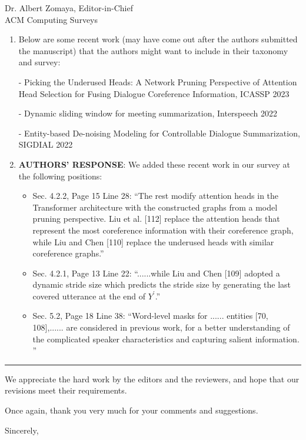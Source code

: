 \documentclass[11pt]{letter} %
\begin{document}
\begin{letter}{
Dr. Albert Zomaya, Editor-in-Chief  \\
ACM Computing Surveys}
\begin{enumerate}
\begin{itemize}
		\end{itemize}
	
	\item Below are some recent work (may have come out after the authors submitted the manuscript) that the authors might want to include in their taxonomy and survey:
	
	\quad - Picking the Underused Heads: A Network Pruning Perspective of Attention Head Selection for Fusing Dialogue Coreference Information, ICASSP 2023
	
	\quad - Dynamic sliding window for meeting summarization, Interspeech 2022
	
	\quad - Entity-based De-noising Modeling for Controllable Dialogue Summarization, SIGDIAL 2022
	
	\item[] \textbf{AUTHORS' RESPONSE}: We added these recent work in our survey at the following positions:
		\begin{itemize}
			\item Sec. 4.2.2, Page 15 Line 28: ``The rest modify attention heads in the Transformer architecture with the constructed graphs from a model pruning perspective. Liu et al. [112] replace the attention heads that represent the most coreference information with their coreference graph, while Liu and Chen [110] replace the underused heads with similar coreference graphs.''
			
			\item Sec. 4.2.1, Page 13 Line 22: ``......while Liu and Chen [109] adopted a dynamic stride size which predicts the stride size by generating the last covered utterance at the end of $Y^\prime$.''
			
			\item Sec. 5.2, Page 18 Line 38: ``Word-level masks for ...... entities [70, 108],...... are considered in previous work, for a better understanding of the complicated speaker characteristics and capturing salient information. ''
		\end{itemize}
	
	
\end{enumerate}


\hrule
We appreciate the hard work by the editors and the reviewers, and hope that our revisions meet their requirements.

Once again, thank you very much for your comments and suggestions.

\closing{Sincerely,}




\end{letter}
\end{document}
